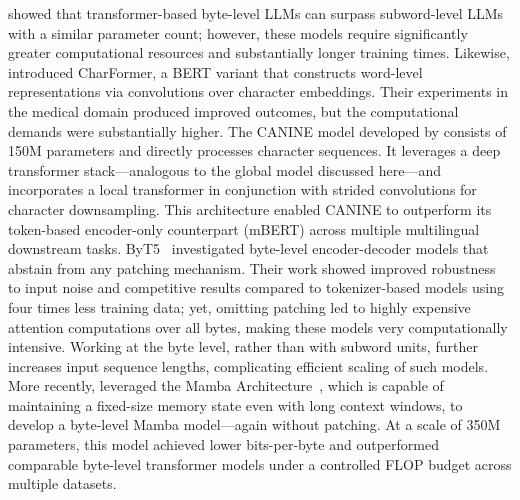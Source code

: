 \cite{Choe2019BridgingTG} showed that transformer-based byte-level LLMs can surpass subword-level LLMs with a similar parameter count; however, these models require significantly greater computational resources and substantially longer training times. Likewise, \cite{el2020characterbert} introduced CharFormer, a BERT variant that constructs word-level representations via convolutions over character embeddings. Their experiments in the medical domain produced improved outcomes, but the computational demands were substantially higher. The CANINE model developed by \cite{clark2022canine} consists of 150M parameters and directly processes character sequences. It leverages a deep transformer stack—analogous to the global model discussed here—and incorporates a local transformer in conjunction with strided convolutions for character downsampling. This architecture enabled CANINE to outperform its token-based encoder-only counterpart (mBERT) across multiple multilingual downstream tasks. ByT5~\citep{xue2022byt5} investigated byte-level encoder-decoder models that abstain from any patching mechanism. Their work showed improved robustness to input noise and competitive results compared to tokenizer-based models using four times less training data; yet, omitting patching led to highly expensive attention computations over all bytes, making these models very computationally intensive. Working at the byte level, rather than with subword units, further increases input sequence lengths, complicating efficient scaling of such models. More recently, \cite{wang2024mambabyte} leveraged the Mamba Architecture~\citep{gu2023mamba}, which is capable of maintaining a fixed-size memory state even with long context windows, to develop a byte-level Mamba model—again without patching. At a scale of 350M parameters, this model achieved lower bits-per-byte and outperformed comparable byte-level transformer models under a controlled FLOP budget across multiple datasets.

